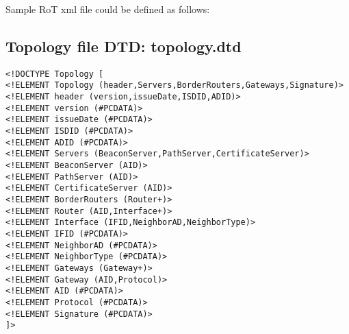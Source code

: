 Sample RoT xml file could be defined as follows:


\subsection{Topology file DTD: topology.dtd}
\label{sec:topologydtd}

\begin{verbatim}
<!DOCTYPE Topology [
<!ELEMENT Topology (header,Servers,BorderRouters,Gateways,Signature)>
<!ELEMENT header (version,issueDate,ISDID,ADID)>
<!ELEMENT version (#PCDATA)>
<!ELEMENT issueDate (#PCDATA)>
<!ELEMENT ISDID (#PCDATA)>
<!ELEMENT ADID (#PCDATA)>
<!ELEMENT Servers (BeaconServer,PathServer,CertificateServer)>
<!ELEMENT BeaconServer (AID)>
<!ELEMENT PathServer (AID)>
<!ELEMENT CertificateServer (AID)>
<!ELEMENT BorderRouters (Router+)>
<!ELEMENT Router (AID,Interface+)>
<!ELEMENT Interface (IFID,NeighborAD,NeighborType)>
<!ELEMENT IFID (#PCDATA)>
<!ELEMENT NeighborAD (#PCDATA)>
<!ELEMENT NeighborType (#PCDATA)>
<!ELEMENT Gateways (Gateway+)>
<!ELEMENT Gateway (AID,Protocol)>
<!ELEMENT AID (#PCDATA)>
<!ELEMENT Protocol (#PCDATA)>
<!ELEMENT Signature (#PCDATA)>
]>
\end{verbatim}


